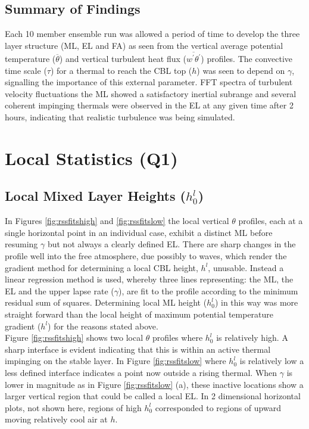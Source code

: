 \subsection{Summary of Findings}

Each 10 member ensemble run was allowed a period of time to develop the three layer structure (\acs{ML}, \acs{EL}
and \acs{FA}) as seen from the vertical average potential temperature ($\overline{\theta}$) and vertical 
turbulent heat flux ($\overline{w^{'}\theta^{'}}$) profiles. The convective time scale ($\tau$) for a thermal 
to reach the \acs{CBL} top ($h$) was seen to depend on $\gamma$, signalling the importance of this external parameter. 
\acs{FFT} spectra of turbulent velocity fluctuations the \acs{ML} showed a satisfactory inertial subrange and several coherent 
impinging thermals were observed in the \acs{EL} at any given time after 2 hours, indicating that 
realistic turbulence was being simulated.\\

\clearpage

\section{Local Statistics (Q1)}
\label{sec:q1}

\subsection{Local Mixed Layer Heights ($h_{0}^{l}$)}
\label{subsec:locmlh}     
\FloatBarrier

In Figures \ref{fig:rssfitshigh} and \ref{fig:rssfitslow} the local vertical $\theta$ profiles,  each at a single horizontal point in an individual case, exhibit a distinct \acs{ML} before resuming $\gamma$ but not always a clearly defined \acs{EL}.  There are sharp changes in the profile well into the free 
atmosphere, due possibly to waves, which render the gradient method for determining a local \acs{CBL} height, $h^{l}$, 
unusable.  Instead a linear regression method is used, whereby three lines representing: the
 \acs{ML}, the \acs{EL} and the upper lapse rate ($\gamma$), are fit to the profile according 
to the minimum residual sum of squares.  Determining local \acs{ML} height ($h_{0}^{l}$) in this way was 
more straight forward than the local height of maximum potential temperature gradient 
($h^{l}$) for the reasons stated above.\\  

Figure \ref{fig:rssfitshigh} shows two local $\theta$ profiles where $h_{0}^{l}$ is relatively high.  
A sharp interface is evident indicating that this is within an active thermal impinging on the stable layer.
In Figure \ref{fig:rssfitslow} where $h_{0}^{l}$ is relatively low a less defined interface indicates 
a point now outside a rising thermal.  When $\gamma$ is lower in magnitude as in Figure \ref{fig:rssfitslow} (a), 
these inactive locations show a larger vertical region that could be called a local \acs{EL}.  
In 2 dimensional horizontal plots, not shown here, regions of high 
$h_{0}^{l}$ corresponded to regions of upward moving relatively cool air at $h$.\\

